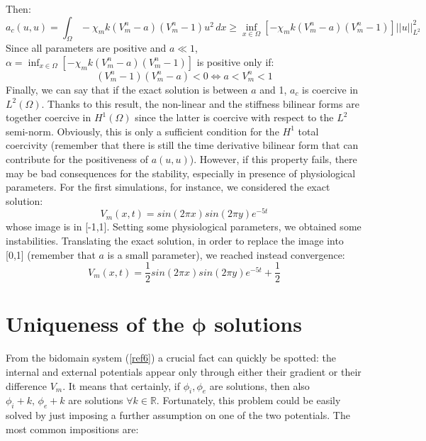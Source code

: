 \documentclass[a4paper]{article}
\begin{document}
\noindent Then:
\begin{equation}
a_c(u,u) = \int_\Omega -\chi_mk(V_m^{n}-a)(V_m^{n}-1)u^2 \, dx \ge \inf_{x \in \Omega} [-\chi_mk(V_m^{n}-a)(V_m^{n}-1)] ||u||_{L^2}^2
\end{equation}
\newline
Since all parameters are positive and $a\ll1$, $\alpha =\inf_{x \in \Omega} [-\chi_mk(V_m^{n}-a)(V_m^{n}-1)]$ is positive only if:\newline
\begin{equation}
(V_m^{n}-1)(V_m^{n}-a) < 0 \Leftrightarrow a<V_m^n < 1
\end{equation}
\newline
Finally, we can say that if the exact solution is between $a$ and 1, $a_c$ is coercive in $L^2(\Omega)$.\newline
Thanks to this result, the non-linear and the stiffness bilinear forms are together coercive in $H^1(\Omega)$ since the latter is coercive with respect to the $L^2$ semi-norm. \vspace{4mm}\newline
Obviously, this is only a sufficient condition for the $H^1$ total coercivity (remember that there is still the time derivative bilinear form that can contribute for the positiveness of $a(u,u)$). However, if this property fails, there may be bad consequences for the stability, especially in presence of physiological parameters.
For the first simulations, for instance, we considered the exact solution:
\begin{equation}
V_m(x,t)=sin(2 \pi x) sin(2 \pi y) e^{-5t}
\end{equation}
whose image is in [-1,1]. Setting some physiological parameters, we obtained some instabilities. 
Translating the exact solution, in order to replace the image into [0,1] (remember that $a$ is a small parameter), we reached instead convergence:
\begin{equation}
V_m(x,t)=\frac{1}{2} sin(2 \pi x) sin(2 \pi y) e^{-5 t}+\frac{1}{2}
\end{equation}


\newpage
\section{Uniqueness of the $\bm{\phi}$ solutions}
\noindent From the bidomain system (\ref{ref6}) a crucial fact can quickly be spotted: the internal and external potentials appear only through either their gradient or their difference $V_m$. It means that certainly, if $\phi_i,\phi_e$ are solutions, then also $\phi_i+k,\,\phi_e+k$ are solutions $\forall k \in \mathbb{R}$. Fortunately, this problem could be easily solved by just imposing a further assumption on one of the two potentials. The most common impositions are:
\end{document}
